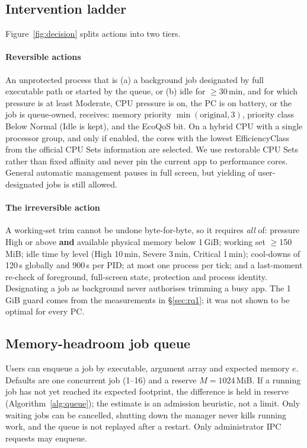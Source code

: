 \documentclass[11pt]{article}
\begin{document}
\subsection{Intervention ladder}
\label{sec:ladder}
Figure~\ref{fig:decision} splits actions into two tiers.

\paragraph{Reversible actions}
An unprotected process that is (a) a background job designated by full executable path or started by the queue, or (b) idle for $\ge$30\,min, and for which pressure is at least Moderate, CPU pressure is on, the PC is on battery, or the job is queue-owned, receives: memory priority $\min(\text{original},3)$, priority class Below Normal (Idle is kept), and the EcoQoS bit\citep{mssetprocinfo,mspriority,ecoqos2021}. On a hybrid CPU with a single processor group, and only if enabled, the cores with the lowest EfficiencyClass from the official CPU Sets information are selected\citep{mscpusets}. We use restorable CPU Sets rather than fixed affinity and never pin the current app to performance cores. General automatic management pauses in full screen, but yielding of user-designated jobs is still allowed.

\paragraph{The irreversible action}
A working-set trim cannot be undone byte-for-byte, so it requires \emph{all} of: pressure High or above \textbf{and} available physical memory below 1\,GiB; working set $\ge$150\,MiB; idle time by level (High 10\,min, Severe 3\,min, Critical 1\,min); cool-downs of 120\,s globally and 900\,s per PID; at most one process per tick; and a last-moment re-check of foreground, full-screen state, protection and process identity. Designating a job as background never authorises trimming a busy app. The 1\,GiB guard comes from the measurements in \S\ref{sec:rq1}; it was not shown to be optimal for every PC.

\subsection{Memory-headroom job queue}
\label{sec:queue}
Users can enqueue a job by executable, argument array and expected memory $e$. Defaults are one concurrent job (1--16) and a reserve $M=1024$\,MiB. If a running job has not yet reached its expected footprint, the difference is held in reserve (Algorithm~\ref{alg:queue}); the estimate is an admission heuristic, not a limit. Only waiting jobs can be cancelled, shutting down the manager never kills running work, and the queue is not replayed after a restart. Only administrator IPC requests may enqueue.
\end{document}
